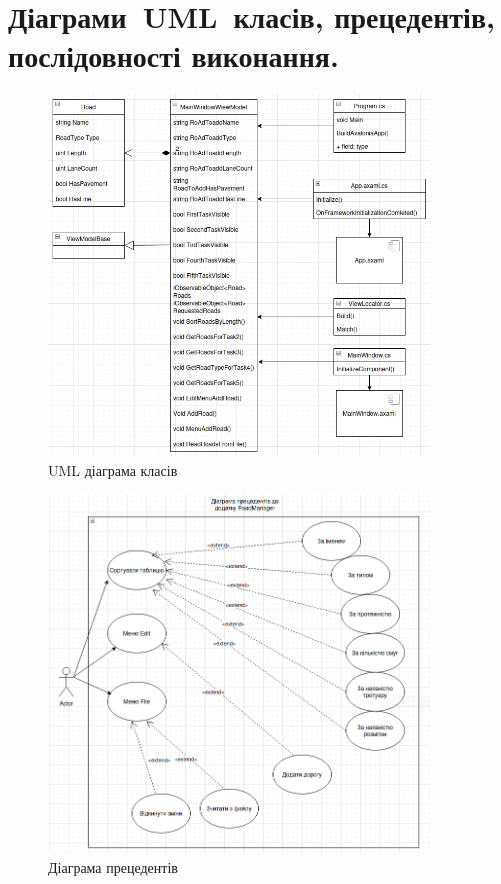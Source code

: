 \documentclass[14pt]{extarticle}
\begin{document}
\section{Діаграми UML класів, прецедентів, послідовності виконання.}
\begin{figure}[H]
    \centering
    \includegraphics[width=0.90\textwidth]{class_diagram}
    \caption{UML діаграма класів}
\end{figure}
\begin{figure}[H]
    \centering
    \includegraphics[width=0.90\textwidth]{actor}
    \caption{Діаграма прецедентів}
\end{figure}
\end{document}
